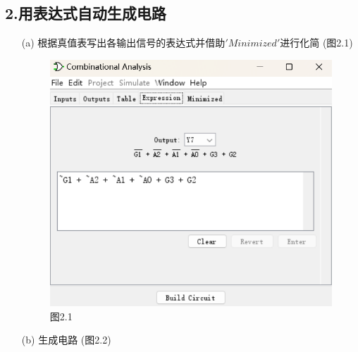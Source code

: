 \documentclass{article}
\begin{document}
        \subsection*{2.用表达式自动生成电路}
        \begin{enumerate}
            \item [(a)]根据真值表写出各输出信号的表达式并借助$'Minimized'$进行化简 (图2.1)
            \begin{figure}[htbp]
                \centering
                \includegraphics[scale=0.5]{t21.png}
                \caption*{图2.1}
            \end{figure}
            \item [(b)]生成电路 (图2.2)
            \begin{figure}[h]
                \centering

\end{figure}
\end{enumerate}
\end{document}

